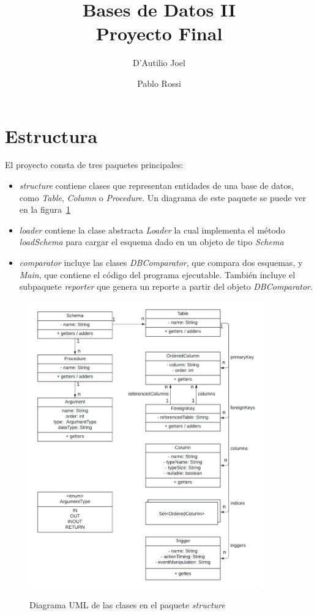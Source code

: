 \documentclass[11pt]{article}
\title{Bases de Datos II \\ \large Proyecto Final}
\author{D'Autilio Joel \and Pablo Rossi}
\begin{document}
\maketitle

\section{Estructura}

El proyecto consta de tres paquetes principales:

\begin{itemize}
	\item \textit{structure} contiene clases que representan entidades de una base de datos, como \textit{Table}, \textit{Column} o \textit{Procedure}.
	      Un diagrama de este paquete se puede ver en la figura~\ref{fig:uml}
	\item \textit{loader} contiene la clase abstracta \textit{Loader} la cual implementa el método \textit{loadSchema} para cargar el esquema dado en un objeto de tipo \textit{Schema}
	\item \textit{comparator} incluye las clases \textit{DBComparator}, que compara dos esquemas, y \textit{Main}, que contiene el código del programa ejecutable. También incluye el subpaquete \textit{reporter} que genera un reporte a partir del objeto \textit{DBComparator}.
\end{itemize}

\begin{figure}[ht]
	\centering
	\includegraphics[width=0.9\textwidth]{uml}\label{fig:uml}
	\caption{Diagrama UML de las clases en el paquete \textit{structure}}
\end{figure}
\end{document}

